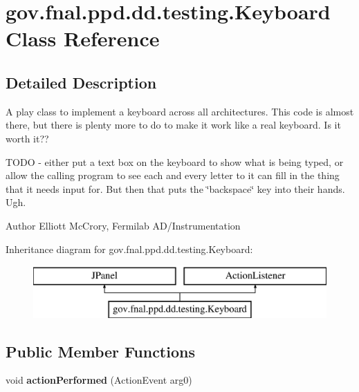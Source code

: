 \hypertarget{classgov_1_1fnal_1_1ppd_1_1dd_1_1testing_1_1Keyboard}{\section{gov.\-fnal.\-ppd.\-dd.\-testing.\-Keyboard Class Reference}
\label{classgov_1_1fnal_1_1ppd_1_1dd_1_1testing_1_1Keyboard}
}


\subsection{Detailed Description}
A play class to implement a keyboard across all architectures. This code is almost there, but there is plenty more to do to make it work like a real keyboard. Is it worth it??

T\-O\-D\-O -\/ either put a text box on the keyboard to show what is being typed, or allow the calling program to see each and every letter to it can fill in the thing that it needs input for. But then that puts the \char`\"{}backspace\char`\"{} key into their hands. Ugh.

\begin{DoxyAuthor}{Author}
Elliott Mc\-Crory, Fermilab A\-D/\-Instrumentation 
\end{DoxyAuthor}
Inheritance diagram for gov.\-fnal.\-ppd.\-dd.\-testing.\-Keyboard\-:\begin{figure}[H]
\begin{center}
\leavevmode
\includegraphics[height=2.000000cm]{classgov_1_1fnal_1_1ppd_1_1dd_1_1testing_1_1Keyboard}
\end{center}
\end{figure}
\subsection*{Public Member Functions}
\begin{DoxyCompactItemize}
\item 
\hypertarget{classgov_1_1fnal_1_1ppd_1_1dd_1_1testing_1_1Keyboard_a668187de053316116d61b9b3652b24af}{void {\bfseries action\-Performed} (Action\-Event arg0)}\label{classgov_1_1fnal_1_1ppd_1_1dd_1_1testing_1_1Keyboard_a668187de053316116d61b9b3652b24af}

\end{DoxyCompactItemize}

